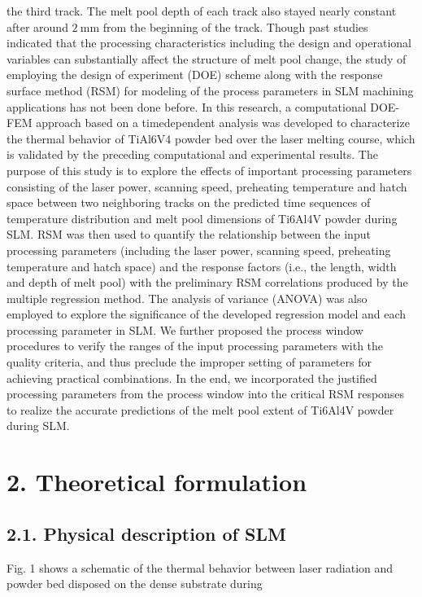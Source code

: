 \documentclass[10pt]{article}
\begin{document}
the third track. The melt pool depth of each track also stayed nearly constant after around $2 \mathrm{~mm}$ from the beginning of the track. Though past studies indicated that the processing characteristics including the design and operational variables can substantially affect the structure of melt pool change, the study of employing the design of experiment (DOE) scheme along with the response surface method (RSM) for modeling of the process parameters in SLM machining applications has not been done before. In this research, a computational DOE-FEM approach based on a timedependent analysis was developed to characterize the thermal behavior of TiAl6V4 powder bed over the laser melting course, which is validated by the preceding computational and experimental results. The purpose of this study is to explore the effects of important processing parameters consisting of the laser power, scanning speed, preheating temperature and hatch space between two neighboring tracks on the predicted time sequences of temperature distribution and melt pool dimensions of Ti6Al4V powder during SLM. RSM was then used to quantify the relationship between the input processing parameters (including the laser power, scanning speed, preheating temperature and hatch space) and the response factors (i.e., the length, width and depth of melt pool) with the preliminary RSM correlations produced by the multiple regression method. The analysis of variance (ANOVA) was also employed to explore the significance of the developed regression model and each processing parameter in SLM. We further proposed the process window procedures to verify the ranges of the input processing parameters with the quality criteria, and thus preclude the improper setting of parameters for achieving practical combinations. In the end, we incorporated the justified processing parameters from the process window into the critical RSM responses to realize the accurate predictions of the melt pool extent of Ti6Al4V powder during SLM.

\section*{2. Theoretical formulation}
\subsection*{2.1. Physical description of SLM}
Fig. 1 shows a schematic of the thermal behavior between laser radiation and powder bed disposed on the dense substrate during
\end{document}
